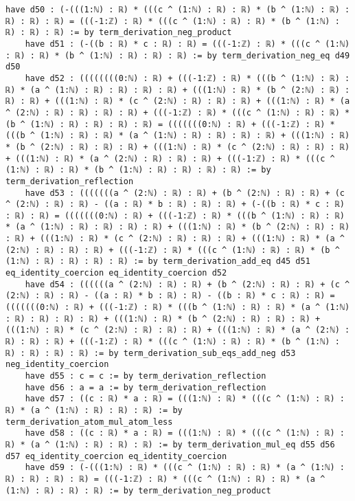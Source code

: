 \documentclass{article}
\begin{document}
\begin{tcolorbox}[colback=white!10, width=\linewidth]
\begin{lstlisting}[language=Lean4]
    have d50 : (-(((1:ℕ) : ℝ) * (((c ^ (1:ℕ) : ℝ) : ℝ) * (b ^ (1:ℕ) : ℝ) : ℝ) : ℝ) : ℝ) = (((-1:ℤ) : ℝ) * (((c ^ (1:ℕ) : ℝ) : ℝ) * (b ^ (1:ℕ) : ℝ) : ℝ) : ℝ) := by term_derivation_neg_product
    have d51 : (-((b : ℝ) * c : ℝ) : ℝ) = (((-1:ℤ) : ℝ) * (((c ^ (1:ℕ) : ℝ) : ℝ) * (b ^ (1:ℕ) : ℝ) : ℝ) : ℝ) := by term_derivation_neg_eq d49 d50
    have d52 : ((((((((0:ℕ) : ℝ) + (((-1:ℤ) : ℝ) * (((b ^ (1:ℕ) : ℝ) : ℝ) * (a ^ (1:ℕ) : ℝ) : ℝ) : ℝ) : ℝ) + (((1:ℕ) : ℝ) * (b ^ (2:ℕ) : ℝ) : ℝ) : ℝ) + (((1:ℕ) : ℝ) * (c ^ (2:ℕ) : ℝ) : ℝ) : ℝ) + (((1:ℕ) : ℝ) * (a ^ (2:ℕ) : ℝ) : ℝ) : ℝ) : ℝ) + (((-1:ℤ) : ℝ) * (((c ^ (1:ℕ) : ℝ) : ℝ) * (b ^ (1:ℕ) : ℝ) : ℝ) : ℝ) : ℝ) = (((((((0:ℕ) : ℝ) + (((-1:ℤ) : ℝ) * (((b ^ (1:ℕ) : ℝ) : ℝ) * (a ^ (1:ℕ) : ℝ) : ℝ) : ℝ) : ℝ) + (((1:ℕ) : ℝ) * (b ^ (2:ℕ) : ℝ) : ℝ) : ℝ) + (((1:ℕ) : ℝ) * (c ^ (2:ℕ) : ℝ) : ℝ) : ℝ) + (((1:ℕ) : ℝ) * (a ^ (2:ℕ) : ℝ) : ℝ) : ℝ) + (((-1:ℤ) : ℝ) * (((c ^ (1:ℕ) : ℝ) : ℝ) * (b ^ (1:ℕ) : ℝ) : ℝ) : ℝ) : ℝ) := by term_derivation_reflection
    have d53 : (((((((a ^ (2:ℕ) : ℝ) : ℝ) + (b ^ (2:ℕ) : ℝ) : ℝ) + (c ^ (2:ℕ) : ℝ) : ℝ) - ((a : ℝ) * b : ℝ) : ℝ) : ℝ) + (-((b : ℝ) * c : ℝ) : ℝ) : ℝ) = (((((((0:ℕ) : ℝ) + (((-1:ℤ) : ℝ) * (((b ^ (1:ℕ) : ℝ) : ℝ) * (a ^ (1:ℕ) : ℝ) : ℝ) : ℝ) : ℝ) + (((1:ℕ) : ℝ) * (b ^ (2:ℕ) : ℝ) : ℝ) : ℝ) + (((1:ℕ) : ℝ) * (c ^ (2:ℕ) : ℝ) : ℝ) : ℝ) + (((1:ℕ) : ℝ) * (a ^ (2:ℕ) : ℝ) : ℝ) : ℝ) + (((-1:ℤ) : ℝ) * (((c ^ (1:ℕ) : ℝ) : ℝ) * (b ^ (1:ℕ) : ℝ) : ℝ) : ℝ) : ℝ) := by term_derivation_add_eq d45 d51 eq_identity_coercion eq_identity_coercion d52
    have d54 : ((((((a ^ (2:ℕ) : ℝ) : ℝ) + (b ^ (2:ℕ) : ℝ) : ℝ) + (c ^ (2:ℕ) : ℝ) : ℝ) - ((a : ℝ) * b : ℝ) : ℝ) - ((b : ℝ) * c : ℝ) : ℝ) = (((((((0:ℕ) : ℝ) + (((-1:ℤ) : ℝ) * (((b ^ (1:ℕ) : ℝ) : ℝ) * (a ^ (1:ℕ) : ℝ) : ℝ) : ℝ) : ℝ) + (((1:ℕ) : ℝ) * (b ^ (2:ℕ) : ℝ) : ℝ) : ℝ) + (((1:ℕ) : ℝ) * (c ^ (2:ℕ) : ℝ) : ℝ) : ℝ) + (((1:ℕ) : ℝ) * (a ^ (2:ℕ) : ℝ) : ℝ) : ℝ) + (((-1:ℤ) : ℝ) * (((c ^ (1:ℕ) : ℝ) : ℝ) * (b ^ (1:ℕ) : ℝ) : ℝ) : ℝ) : ℝ) := by term_derivation_sub_eqs_add_neg d53 neg_identity_coercion
    have d55 : c = c := by term_derivation_reflection
    have d56 : a = a := by term_derivation_reflection
    have d57 : ((c : ℝ) * a : ℝ) = (((1:ℕ) : ℝ) * (((c ^ (1:ℕ) : ℝ) : ℝ) * (a ^ (1:ℕ) : ℝ) : ℝ) : ℝ) := by term_derivation_atom_mul_atom_less
    have d58 : ((c : ℝ) * a : ℝ) = (((1:ℕ) : ℝ) * (((c ^ (1:ℕ) : ℝ) : ℝ) * (a ^ (1:ℕ) : ℝ) : ℝ) : ℝ) := by term_derivation_mul_eq d55 d56 d57 eq_identity_coercion eq_identity_coercion
    have d59 : (-(((1:ℕ) : ℝ) * (((c ^ (1:ℕ) : ℝ) : ℝ) * (a ^ (1:ℕ) : ℝ) : ℝ) : ℝ) : ℝ) = (((-1:ℤ) : ℝ) * (((c ^ (1:ℕ) : ℝ) : ℝ) * (a ^ (1:ℕ) : ℝ) : ℝ) : ℝ) := by term_derivation_neg_product

\end{lstlisting}
\end{tcolorbox}
\end{document}
